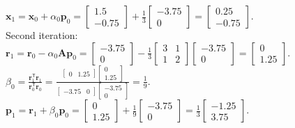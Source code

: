\documentclass{article}
\begin{document}
${\displaystyle \mathbf {x} _{1}=\mathbf {x} _{0}+\alpha _{0}\mathbf {p} _{0}={\begin{bmatrix}1.5\\-0.75\end{bmatrix}}+{\frac {1}{3}}{\begin{bmatrix}-3.75\\0\end{bmatrix}}={\begin{bmatrix}0.25\\-0.75\end{bmatrix}}.}$\\
Second iteration:\\
${\displaystyle \mathbf {r} _{1}=\mathbf {r} _{0}-\alpha _{0}\mathbf {A} \mathbf {p} _{0}={\begin{bmatrix}-3.75\\0\end{bmatrix}}-{\frac {1}{3}}{\begin{bmatrix}3&1\\1&2\end{bmatrix}}{\begin{bmatrix}-3.75\\0\end{bmatrix}}={\begin{bmatrix}0\\1.25\end{bmatrix}}.}$\\
${\displaystyle \beta _{0}={\frac {\mathbf {r} _{1}^{\mathsf {T}}\mathbf {r} _{1}}{\mathbf {r} _{0}^{\mathsf {T}}\mathbf {r} _{0}}}={\frac {{\begin{bmatrix}0&1.25\end{bmatrix}}{\begin{bmatrix}0\\1.25\end{bmatrix}}}{{\begin{bmatrix}-3.75&0\end{bmatrix}}{\begin{bmatrix}-3.75\\0\end{bmatrix}}}}={\frac {1}{9}}.}$\\
${\displaystyle \mathbf {p} _{1}=\mathbf {r} _{1}+\beta _{0}\mathbf {p} _{0}={\begin{bmatrix}0\\1.25\end{bmatrix}}+{\frac{1}{9}}{\begin{bmatrix}-3.75\\0\end{bmatrix}}={\frac {1}{3}}{\begin{bmatrix}-1.25\\3.75\end{bmatrix}}.}$\\
\end{document}
